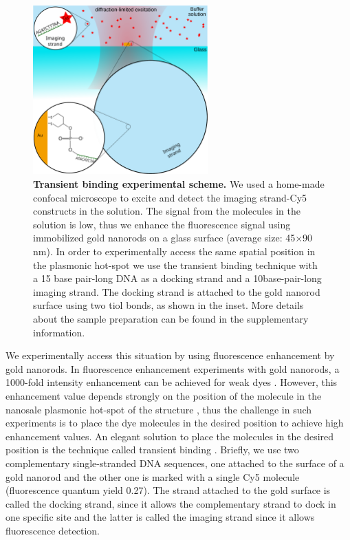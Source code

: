 \begin{figure}
\centering
\includegraphics[width=0.6\textwidth]{Transient_scheme}%
\caption{\textbf{Transient binding experimental scheme.} We used a home-made confocal microscope to excite and detect the imaging strand-Cy5 constructs in the solution. The signal from the molecules in the solution is low, thus we enhance the fluorescence signal using immobilized gold nanorods on a glass surface (average size: 45$\times$90 nm). In order to experimentally access the same spatial position in the plasmonic hot-spot we use the transient binding technique with a 15 base pair-long DNA as a docking strand and a 10base-pair-long imaging strand. The docking strand is attached to the gold nanorod surface using two tiol bonds, as shown in the inset. More details about the sample preparation can be found in the supplementary information. 
\label{fg:transient}}
\end{figure}

We experimentally access this situation by using fluorescence enhancement by gold nanorods. In fluorescence enhancement experiments with gold nanorods, a 1000-fold intensity enhancement can be achieved for weak dyes \cite{yuan2013thousandfold,khatua2014resonant}. However, this enhancement value depends strongly on the position of the molecule in the nanosale plasmonic hot-spot of the structure \cite{khatua2014resonant}, thus the challenge in such experiments is to place the dye molecules in the desired position to achieve high enhancement values. An elegant solution to place the molecules in the desired position is the technique called transient binding \cite{acuna2012fluorescence}.
Briefly, we use two complementary single-stranded DNA sequences, one attached to the surface of a gold nanorod and the other one is marked with a single Cy5 molecule (fluorescence quantum yield 0.27). The strand attached to the gold surface is  called the docking strand, since it allows the complementary strand to dock in one specific site and the latter is called the imaging strand since it allows fluorescence detection. 

